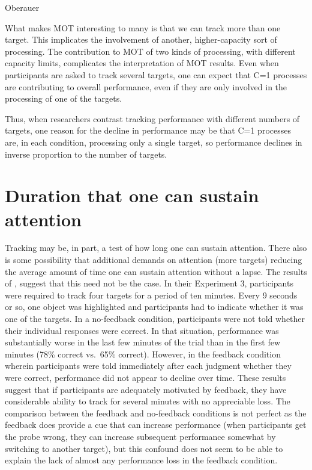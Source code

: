 \documentclass[]{book}
\begin{document}
Oberauer

What makes MOT interesting to many is that we can track more than one target. This implicates the involvement of another, higher-capacity sort of processing. The contribution to MOT of two kinds of processing, with different capacity limits, complicates the interpretation of MOT results. Even when participants are asked to track several targets, one can expect that C=1 processes are contributing to overall performance, even if they are only involved in the processing of one of the targets.

Thus, when researchers contrast tracking performance with different numbers of targets, one reason for the decline in performance may be that C=1 processes are, in each condition, processing only a single target, so performance declines in inverse proportion to the number of targets.

\hypertarget{duration-that-one-can-sustain-attention}{%
\section{Duration that one can sustain attention}\label{duration-that-one-can-sustain-attention}}

Tracking may be, in part, a test of how long one can sustain attention. There also is some possibility that additional demands on attention (more targets) reducing the average amount of time one can sustain attention without a lapse. The results of \citet{wolfeMultipleObjectJuggling2007}, suggest that this need not be the case. In their Experiment 3, participants were required to track four targets for a period of ten minutes. Every 9 seconds or so, one object was highlighted and participants had to indicate whether it was one of the targets. In a no-feedback condition, participants were not told whether their individual responses were correct. In that situation, performance was substantially worse in the last few minutes of the trial than in the first few minutes (78\% correct vs.~65\% correct). However, in the feedback condition wherein participants were told immediately after each judgment whether they were correct, performance did not appear to decline over time. These results suggest that if participants are adequately motivated by feedback, they have considerable ability to track for several minutes with no appreciable loss. The comparison between the feedback and no-feedback conditions is not perfect as the feedback does provide a cue that can increase performance (when participants get the probe wrong, they can increase subsequent performance somewhat by switching to another target), but this confound does not seem to be able to explain the lack of almost any performance loss in the feedback condition.
\end{document}
